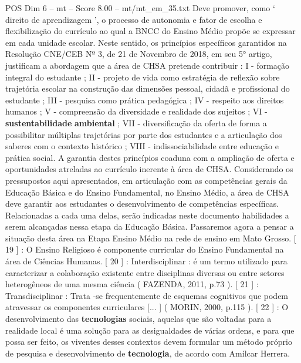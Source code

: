 \begin{textsample}{POS Dim 6 – mt – Score 8.00 – mt/mt\_em\_35.txt}
Deve promover, como ‘ direito de aprendizagem ’, o processo de autonomia e fator de escolha e flexibilização do currículo ao qual a BNCC do Ensino Médio propõe se expressar em cada unidade escolar.
Neste sentido, os princípios específicos garantidos na Resolução CNE/CEB Nº 3, de 21 de Novembro de 2018, em seu 5{\EmojiFont °} artigo, justificam a abordagem que a área de CHSA pretende contribuir : I - formação integral do estudante ; II - projeto de vida como estratégia de reflexão sobre trajetória escolar na construção das dimensões pessoal, cidadã e profissional do estudante ; III - pesquisa como prática pedagógica ; IV - respeito aos direitos humanos ; V - compreensão da diversidade e realidade dos sujeitos ; VI - \textbf{sustentabilidade} \textbf{ambiental} ; VII - diversificação da oferta de forma a possibilitar múltiplas trajetórias por parte dos estudantes e a articulação dos saberes com o contexto histórico ; VIII - indissociabilidade entre educação e prática social.
A garantia destes princípios coaduna com a ampliação de oferta e oportunidades atreladas ao currículo inerente à área de CHSA.
Considerando os pressupostos aqui apresentados, em articulação com as competências gerais da Educação Básica e do Ensino Fundamental, no Ensino Médio, a área de CHSA deve garantir aos estudantes o desenvolvimento de competências específicas.
Relacionadas a cada uma delas, serão indicadas neste documento habilidades a serem alcançadas nessa etapa da Educação Básica.
Passaremos agora a pensar a situação desta área na Etapa Ensino Médio na rede de ensino em Mato Grosso. [ 19 ] : O Ensino Religioso é componente curricular do Ensino Fundamental na área de Ciências Humanas. [ 20 ] : Interdisciplinar : é um termo utilizado para caracterizar a colaboração existente entre disciplinas diversas ou entre setores heterogêneos de uma mesma ciência ( FAZENDA, 2011, p.73 ). [ 21 ] : Transdisciplinar : Trata -se frequentemente de esquemas cognitivos que podem atravessar os componentes curriculares [... ] ( MORIN, 2000, p.115 ). [ 22 ] : O desenvolvimento das \textbf{tecnologias} sociais, aquelas que são voltadas para a realidade local é uma solução para as desigualdades de várias ordens, e para que possa ser feito, os viventes desses contextos devem formular um método próprio de pesquisa e desenvolvimento de \textbf{tecnologia}, de acordo com Amílcar Herrera.

\end{textsample}
